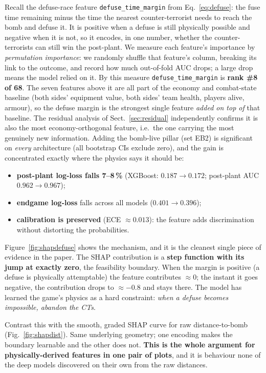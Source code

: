 \documentclass[11pt,a4paper]{article}
\begin{document}
Recall the defuse-race feature \texttt{defuse\_time\_margin} from Eq.~\ref{eq:defuse}: the fuse
time remaining minus the time the nearest counter-terrorist needs to reach the bomb and defuse
it. It is positive when a defuse is still physically possible and negative when it is not, so it
encodes, in one number, whether the counter-terrorists can still win the post-plant. We measure
each feature's importance by \emph{permutation importance}: we randomly shuffle that feature's
column, breaking its link to the outcome, and record how much out-of-fold AUC drops; a large drop
means the model relied on it. By this measure \texttt{defuse\_time\_margin} is \textbf{rank \#8 of
68}. The seven features above it are all part of the economy and combat-state baseline (both
sides' equipment value, both sides' team health, players alive, armour), so the defuse margin is
the strongest single feature \emph{added on top of} that baseline. The residual analysis of
Sect.~\ref{sec:residual} independently confirms it is also the most economy-orthogonal feature,
i.e.\ the one carrying the most genuinely new information. Adding the bomb-live pillar (set EB2)
is significant on \emph{every} architecture (all bootstrap CIs exclude zero), and the gain is
concentrated exactly where the physics says it should be:

\begin{itemize}
  \item \textbf{post-plant log-loss falls 7--8\,\%} (XGBoost: $0.187 \to 0.172$; post-plant
    AUC $0.962 \to 0.967$);
  \item \textbf{endgame log-loss} falls across all models ($0.401 \to 0.396$);
  \item \textbf{calibration is preserved} (ECE $\approx 0.013$): the feature adds
    discrimination without distorting the probabilities.
\end{itemize}

Figure~\ref{fig:shapdefuse} shows the mechanism, and it is the cleanest single piece of
evidence in the paper. The SHAP contribution is a \textbf{step function with its jump at
exactly zero}, the feasibility boundary. When the margin is positive (a defuse is
physically attemptable) the feature contributes $\approx 0$; the instant it goes negative,
the contribution drops to $\approx -0.8$ and stays there. The model has learned the game's
physics as a hard constraint: \emph{when a defuse becomes impossible, abandon the CTs}.

Contrast this with the smooth, graded SHAP curve for raw distance-to-bomb
(Fig.~\ref{fig:shapdist}). Same underlying geometry; one encoding makes the boundary
learnable and the other does not. \textbf{This is the whole argument for
physically-derived features in one pair of plots}, and it is behaviour none of the deep
models discovered on their own from the raw distances.
\end{document}
